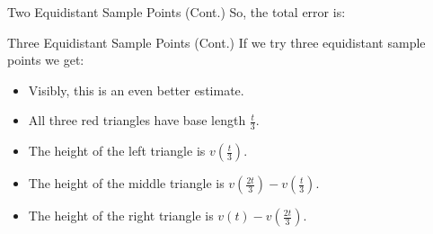 \documentclass[Lecture.tex]{subfiles}
\begin{document}
\begin{frame}{Two Equidistant Sample Points (Cont.)}
  So, the total error is:
\end{frame}

\begin{frame}{Three Equidistant Sample Points (Cont.)}
  If we try three equidistant sample points we get:\\
  \vfill
  \begin{minipage}{0.48\linewidth}
  \end{minipage}
  \hfill
  \begin{minipage}{0.48\linewidth}
    \begin{itemize}
    \item<3->
      Visibly, this is an even better estimate.
    \item<4->
      All three red triangles have base length $\frac{t}{3}$.
    \item<5->
      The height of the left triangle is $v\left(\frac{t}{3}\right)$.
    \item<6->
      The height of the middle triangle is $v\left(\frac{2t}{3}\right) - v\left(\frac{t}{3}\right)$.
    \item<7->
      The height of the right triangle is $v(t) - v\left(\frac{2t}{3}\right)$.
    \end{itemize}
  \end{minipage}
\end{frame}
\end{document}
